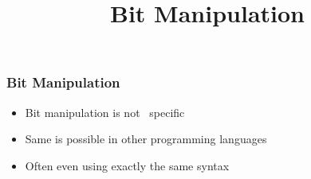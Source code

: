\usepackage{siunitx}


\usetikzlibrary{shadows,shapes.multipart}

\title{Bit Manipulation}

\newcommand{\NOT}{\textasciitilde}
\newcommand{\XOR}{\textasciicircum}



\begin{frame}
  \titlepage
\end{frame}

\begin{frame}
  \frametitle{Bit Manipulation}
  \begin{itemize}
    \item Bit manipulation is not \cpp\ specific
    \item Same is possible in other programming languages
    \item Often even using exactly the same syntax
  \end{itemize}
\end{frame}







